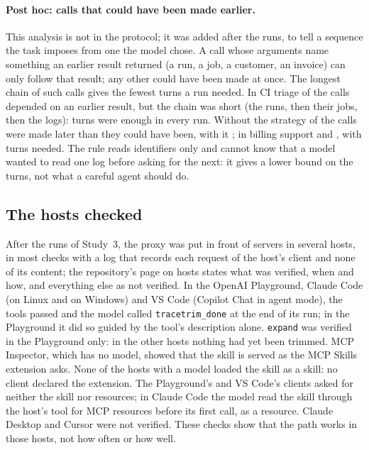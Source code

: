 \paragraph{Post hoc: calls that could have been made earlier.} This analysis is not in the protocol; it was added
after the runs, to tell a sequence the task imposes from one the model chose. A call whose arguments name something
an earlier result returned (a run, a job, a customer, an invoice) can only follow that result; any other could have
been made at once. The longest chain of such calls gives the fewest turns a run needed. In CI triage
\SthreeDependingv{} of the calls depended on an earlier result, but the chain was short (the runs, then their jobs,
then the logs): \SthreeFewestv{} turns were enough in every run. Without the strategy \SthreeEarlierRv{} of the calls
were made later than they could have been, with it \SthreeEarlierSv; in billing support \SthreeEarlierRiv{} and
\SthreeEarlierSiv, with \SthreeFewestiv{} turns needed. The rule reads identifiers only and cannot know that a model
wanted to read one log before asking for the next: it gives a lower bound on the turns, not what a careful agent
should do.

\subsection{The hosts checked}
\label{sec:s3hosts}

After the runs of Study~3, the proxy was put in front of servers in several hosts, in most checks with a log that
records each request of the host's client and none of its content; the repository's page on hosts states what was verified,
when and how, and everything else as not verified. In the OpenAI Playground, Claude Code (on Linux and on Windows)
and VS Code (Copilot Chat in agent mode), the tools passed and the model called \texttt{tracetrim\_done} at the end
of its run; in the Playground it did so guided by the tool's description alone. \texttt{expand} was verified in the
Playground only: in the other hosts nothing had yet been trimmed. MCP Inspector, which has no model, showed that the
skill is served as the MCP Skills extension asks. None of the hosts with a model loaded the skill as a skill: no
client declared the extension. The Playground's and VS Code's clients asked for neither the skill nor resources; in Claude Code the model
read the skill through the host's tool for MCP resources before its first call, as a resource. Claude Desktop and
Cursor were not verified. These checks show that the path works in those hosts, not how often or how well.

